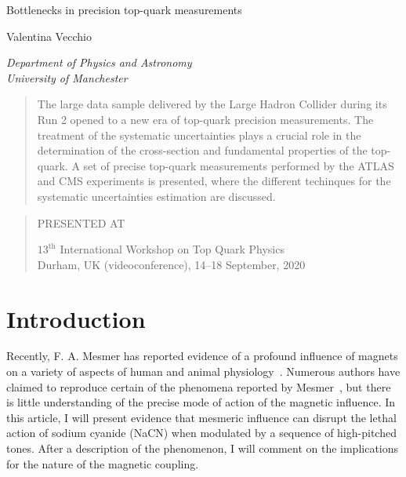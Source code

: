 \documentclass[12pt]{article}
\newcommand\pubnumber{SNSN-323-63}
\newcommand\pubdate{\today}
\def\institute{Department of Physics and Astronomy\\ University of Manchester}
\def\Title#1{\begin{center} {\Large #1 } \end{center}}
\def\Author#1{\begin{center}{ \sc #1} \end{center}}
\def\Address#1{\begin{center}{ \it #1} \end{center}}
\newcommand\pubblock{\rightline{\begin{tabular}{l} \pubnumber\\
         \pubdate  \end{tabular}}}
\newenvironment{Abstract}{\begin{quotation}  }{\end{quotation}}
\newenvironment{Presented}{\begin{quotation} \begin{center} 
             PRESENTED AT\end{center}\bigskip 
      \begin{center}\begin{large}}{\end{large}\end{center} \end{quotation}}
\begin{document}
\begin{titlepage}
\pubblock

\vfill
\Title{Bottlenecks in precision top-quark measurements}
\vfill
\Author{ Valentina Vecchio}
\Address{\institute}
\vfill
\begin{Abstract}


The large data sample delivered by the Large Hadron Collider during its Run 2 opened to a new era of top-quark precision measurements. The treatment of the systematic uncertainties plays a crucial role in the determination of the cross-section and fundamental properties of the top-quark. A set of precise top-quark measurements performed by the ATLAS and CMS experiments is presented, where the different techinques for the systematic uncertainties estimation are discussed.

\end{Abstract}
\vfill
\begin{Presented}
$13^\mathrm{th}$ International Workshop on Top Quark Physics\\
Durham, UK (videoconference), 14--18 September, 2020
\end{Presented}
\vfill
\end{titlepage}
\def\thefootnote{\fnsymbol{footnote}}
\setcounter{footnote}{0}
%

\section{Introduction}

Recently, F.  A. Mesmer 
has reported evidence of a profound influence of 
magnets on a variety of aspects of human and animal physiology~\cite{Mesmer}.
Numerous authors have claimed to reproduce certain of the phenomena 
reported by Mesmer~\cite{diCenzo,Muller}, but there is little understanding
of the precise mode of action of the magnetic influence.  In this
article, I will present evidence that mesmeric influence can disrupt the
lethal action of sodium cyanide (NaCN) when modulated by a sequence of 
high-pitched tones.  After a description of the phenomenon, I will comment
on the implications for the nature of the magnetic coupling.
\end{document}
